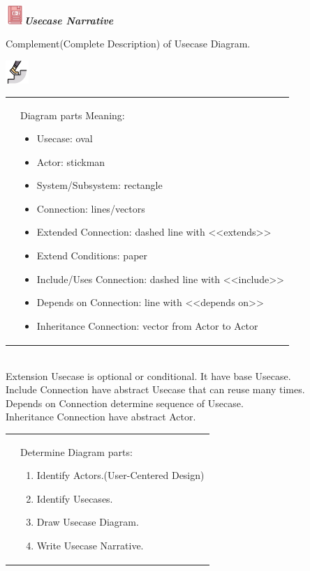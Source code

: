 \documentclass[a4paper, 12pt]{article}
\newcounter{stepcounter}
\theoremstyle{definition}
\newcommand{\deficon}{\includegraphics[width=20pt]{constants/def.png}}
\newcommand{\stepicon}{\includegraphics[width=25pt]{constants/step.png}}
\newcommand{\mydef}[1]{\vspace{10pt} 
\noindent
  \hspace{0.5em}\raisebox{-0.3em} \deficon \quad \textit{\textbf{\textcolor{blue1}{#1}}} \quad
}
\newcommand{\mystepbystep}[1]{\setcounter{stepcounter}{1}
\vspace{10pt} 
\noindent
  \hspace{0.5em}\raisebox{-0.5em} \stepicon \quad {\large \textbf{\textcolor{blue1}{#1}}}
  \\[5pt]
}
\newcommand{\mystep}[1]{
    \noindent
    \begin{tabular}{p{0.1\textwidth} p{0.85\textwidth}}
      {\Large \thestepcounter}& #1
    \end{tabular} 
    \addtocounter{stepcounter}{1} \\[0.5cm]
}
\begin{document}
\mydef{Usecase Narrative}
Complement(Complete Description) of Usecase Diagram.
\newpage

\mystepbystep{Drawing Usecase Diagram}

\mystep{Diagram parts Meaning:
\begin{itemize}
  \item Usecase: oval
  \item Actor: stickman
  \item System/Subsystem: rectangle
  \item Connection: lines/vectors
  \item Extended Connection: dashed line with <<extends>>
  \item Extend Conditions: paper
  \item Include/Uses Connection: dashed line with <<include>>
  \item Depends on Connection: line with <<depends on>>
  \item Inheritance Connection: vector from Actor to Actor
\end{itemize}
}
Extension Usecase is optional or conditional. It have base Usecase. \\
Include Connection have abstract Usecase that can reuse many times. \\
Depends on Connection determine sequence of Usecase. \\
Inheritance Connection have abstract Actor. \\

\mystep{Determine Diagram parts:
\begin{enumerate}
  \item Identify Actors.(User-Centered Design)
  \item Identify Usecases.
  \item Draw Usecase Diagram.
  \item Write Usecase Narrative.
\end{enumerate}
}
\end{document}
